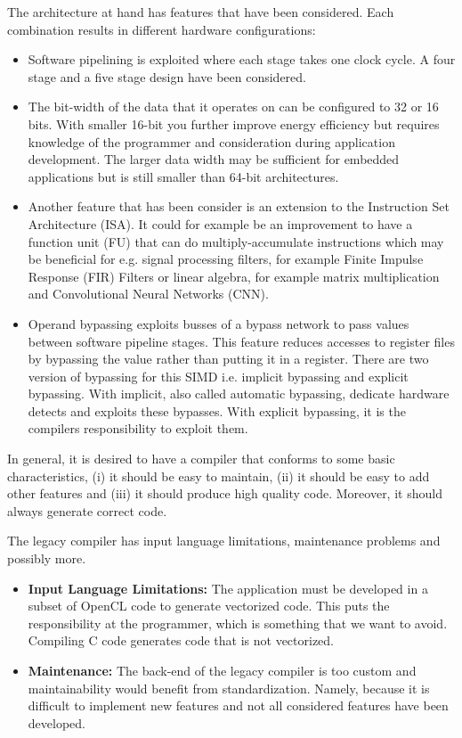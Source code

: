 The architecture at hand has features that have been considered. Each combination results in different hardware configurations:
\begin{itemize}
\item Software pipelining is exploited where each stage takes one clock cycle. A four stage and a five stage design have been considered.
\item	The bit-width of the data that it operates on can be configured to 32 or 16 bits. With smaller 16-bit you further improve energy efficiency but requires knowledge of the programmer and consideration during application development. The larger data width may be sufficient for embedded applications but is still smaller than 64-bit architectures.
\item	Another feature that has been consider is an extension to the Instruction Set Architecture (ISA). It could for example be an improvement to have a function unit (FU) that can do multiply-accumulate instructions which may be beneficial for e.g. signal processing filters, for example Finite Impulse Response (FIR) Filters or linear algebra, for example matrix multiplication and Convolutional Neural Networks (CNN). 
\item Operand bypassing exploits busses of a bypass network to pass values between software pipeline stages. This feature reduces accesses to register files by bypassing the value rather than putting it in a register. There are two version of bypassing for this SIMD i.e. implicit bypassing and explicit bypassing. With implicit, also called automatic bypassing, dedicate hardware detects and exploits these bypasses. With explicit bypassing, it is the compilers responsibility to exploit them.
\end{itemize}

In general, it is desired to have a compiler that conforms to some basic characteristics, (i) it should be easy to maintain, (ii) it should be easy to add other features and (iii) it should produce high quality code. Moreover, it should always generate correct code.

The legacy compiler has input language limitations, maintenance problems and possibly more.
\begin{itemize}
\item \textbf{Input Language Limitations:} The application must be developed in a subset of OpenCL code to generate vectorized code. This puts the responsibility at the programmer, which is something that we want to avoid. Compiling C code generates code that is not vectorized.   
\item \textbf{Maintenance:} The back-end of the legacy compiler is too custom and maintainability would benefit from standardization. Namely, because it is difficult to implement new features and not all considered features have been developed.   
\end{itemize}

